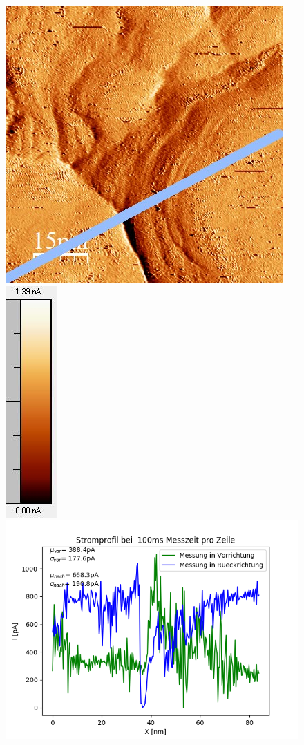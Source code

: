 \documentclass[12pt,a4paper]{article}
\begin{document}
\begin{figure}[H]
\includegraphics[scale=0.6]{Bilder/Anhang/Zeit/Strom/0_1_Zeit_nach_Strom.jpg}
\includegraphics[scale=0.6]{Bilder/Anhang/Zeit/Strom/0_1_Zeit_nach_Strom_Skala.jpg}
\includegraphics[scale=0.5]{Bilder/Anhang/Zeit/Strom/Strom_Profil_Zeit_0100.png}

\end{figure}
\end{document}
